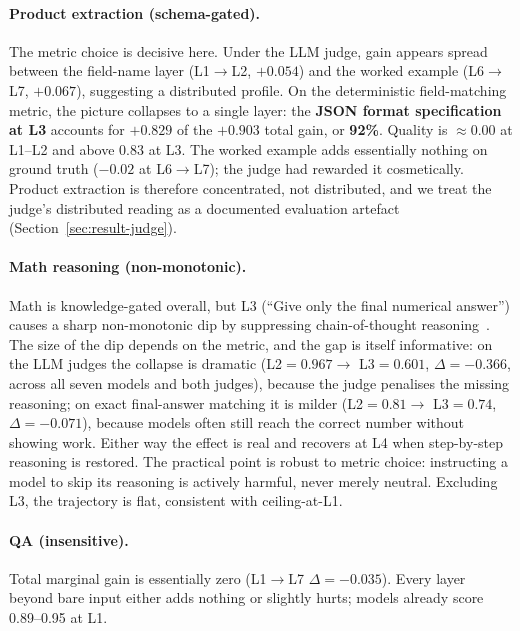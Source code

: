 \paragraph{Product extraction (schema-gated).}
The metric choice is decisive here. Under the LLM judge, gain appears spread
between the field-name layer (L1$\to$L2, $+0.054$) and the worked example
(L6$\to$L7, $+0.067$), suggesting a distributed profile. On the deterministic
field-matching metric, the picture collapses to a single layer: the
\textbf{JSON format specification at L3} accounts for $+0.829$ of the $+0.903$
total gain, or \textbf{92\%}. Quality is $\approx 0.00$ at L1--L2 and above
$0.83$ at L3. The worked example adds essentially nothing on ground truth
($-0.02$ at L6$\to$L7); the judge had rewarded it cosmetically. Product
extraction is therefore concentrated, not distributed, and we treat the judge's
distributed reading as a documented evaluation artefact
(Section~\ref{sec:result-judge}).

\paragraph{Math reasoning (non-monotonic).}
Math is knowledge-gated overall, but L3 (``Give only the final numerical
answer'') causes a sharp non-monotonic dip by suppressing chain-of-thought
reasoning~\citep{wei2022cot}. The size of the dip depends on the metric, and the
gap is itself informative: on the LLM judges the collapse is dramatic
(L2$=0.967 \to$ L3$=0.601$, $\Delta=-0.366$, across all seven models and both
judges), because the judge penalises the missing reasoning; on exact
final-answer matching it is milder (L2$=0.81 \to$ L3$=0.74$, $\Delta=-0.071$),
because models often still reach the correct number without showing work. Either
way the effect is real and recovers at L4 when step-by-step reasoning is
restored. The practical point is robust to metric choice: instructing a model to
skip its reasoning is actively harmful, never merely neutral. Excluding L3, the
trajectory is flat, consistent with ceiling-at-L1.

\paragraph{QA (insensitive).}
Total marginal gain is essentially zero (L1$\to$L7 $\Delta = -0.035$). Every
layer beyond bare input either adds nothing or slightly hurts; models already
score 0.89--0.95 at L1.

